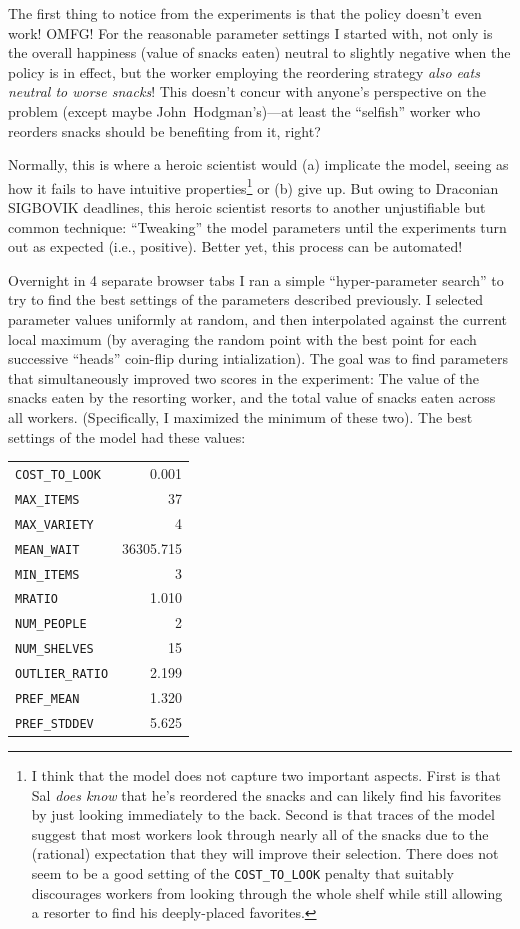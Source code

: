 \documentclass[twocolumn]{article}
\begin{document}
\medskip
The first thing to notice from the experiments is that the policy
doesn't even work! OMFG! For the reasonable parameter settings I
started with, not only is the overall happiness (value of snacks
eaten) neutral to slightly negative when the policy is in effect,
but the worker employing the reordering strategy \emph{also eats
  neutral to worse snacks}! This doesn't concur with anyone's
perspective on the problem (except maybe John~Hodgman's)---at least
the ``selfish'' worker who reorders snacks should be benefiting
from it, right?

Normally, this is where a heroic scientist would (a) implicate the
model, seeing as how it fails to have intuitive properties\footnote{I
  think that the model does not capture two important aspects. First
  is that Sal \emph{does know} that he's reordered the snacks and can
  likely find his favorites by just looking immediately to the back.
  Second is that traces of the model suggest that most workers look
  through nearly all of the snacks due to the (rational) expectation
  that they will improve their selection. There does not seem to be a
  good setting of the {\tt COST\_TO\_LOOK} penalty that suitably
  discourages workers from looking through the whole shelf while still
  allowing a resorter to find his deeply-placed favorites.} or (b)
give up. But owing to Draconian SIGBOVIK deadlines, this heroic
scientist resorts to another unjustifiable but common technique:
``Tweaking'' the model parameters until the experiments turn out as
expected (i.e., positive). Better yet, this process can be automated!

\medskip
Overnight in 4 separate browser tabs I ran a simple ``hyper-parameter
search'' to try to find the best settings of the parameters described
previously. I selected parameter values uniformly at random, and then
interpolated against the current local maximum (by averaging the
random point with the best point for each successive ``heads''
coin-flip during intialization). The goal was to find parameters that
simultaneously improved two scores in the experiment: The value of the
snacks eaten by the resorting worker, and the total value of snacks
eaten across all workers. (Specifically, I maximized the minimum of
these two). The best settings of the model had these values:

\begin{tabular}{@{\hspace{0.5in}}lr}
\verb+COST_TO_LOOK+ & 0.001 \\
\verb+MAX_ITEMS+ & 37 \\
\verb+MAX_VARIETY+ & 4 \\
\verb+MEAN_WAIT+ & 36305.715 \\
\verb+MIN_ITEMS+ & 3 \\
\verb+MRATIO+ & 1.010 \\
\verb+NUM_PEOPLE+ & 2 \\
\verb+NUM_SHELVES+ & 15 \\
\verb+OUTLIER_RATIO+ & 2.199 \\
\verb+PREF_MEAN+ & 1.320 \\
\verb+PREF_STDDEV+ & 5.625 \\
\end{tabular}
\end{document}
